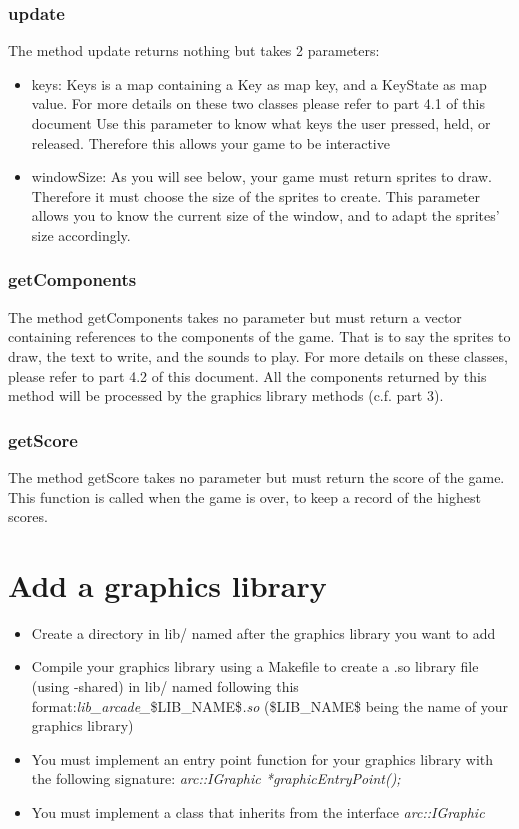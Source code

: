 \documentclass[12pt]{article}
\begin{document}
\subsubsection{update}
The method update returns nothing but takes 2 parameters:
\begin{itemize}
    \item keys:\newline
    Keys is a map containing a Key as map key, and a KeyState as map value.\newline
    For more details on these two classes please refer to part 4.1 of this document\newline
    Use this parameter to know what keys the user pressed, held, or released. Therefore this allows your game to be interactive
    \item windowSize:\newline
    As you will see below, your game must return sprites to draw. Therefore it must choose the size of the sprites to create.\newline
    This parameter allows you to know the current size of the window, and to adapt the sprites' size accordingly.
\end{itemize}
\subsubsection{getComponents}
The method getComponents takes no parameter but must return a vector containing references to the components of the game. That is to say the sprites to draw, the text to write, and the sounds to play.\newline
For more details on these classes, please refer to part 4.2 of this document.\newline
All the components returned by this method will be processed by the graphics library methods (c.f. part 3).
\subsubsection{getScore}
The method getScore takes no parameter but must return the score of the game. This function is called when the game is over, to keep a record of the highest scores.
\section{Add a graphics library}
\begin{itemize}
\item Create a directory in lib/ named after the graphics library you want to add
\item Compile your graphics library using a Makefile to create a .so library file (using -shared) in lib/ named following this format:\newline\emph{lib\_arcade\_}\$LIB\_NAME\$\emph{.so} (\$LIB\_NAME\$ being the name of your graphics library)
\item You must implement an entry point function for your graphics library with the following signature: \newline \emph{arc::IGraphic *graphicEntryPoint();}
\item You must implement a class that inherits from the interface \emph{arc::IGraphic}
\end{itemize}
\end{document}
